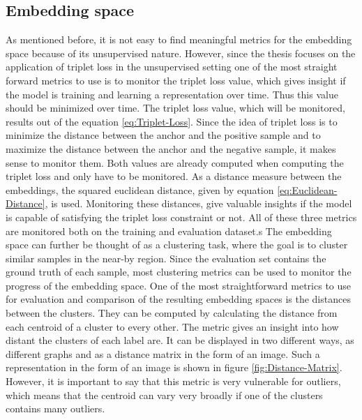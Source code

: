 \subsection{Embedding space}
\label{sub:Metrics-Embedding-Space}
As mentioned before, it is not easy to find meaningful metrics for the embedding space because of its unsupervised nature. However, since the thesis focuses on the application of triplet loss in the unsupervised setting one of the most straight forward metrics to use is to monitor the triplet loss value, which gives insight if the model is training and learning a representation over time. Thus this value should be minimized over time. The triplet loss value, which will be monitored, results out of the equation \ref{eq:Triplet-Loss}. Since the idea of triplet loss is to minimize the distance between the anchor and the positive sample and to maximize the distance between the anchor and the negative sample, it makes sense to monitor them. Both values are already computed when computing the triplet loss and only have to be monitored. As a distance measure between the embeddings, the squared euclidean distance, given by equation \ref{eq:Euclidean-Distance}, is used. Monitoring these distances, give valuable insights if the model is capable of satisfying the triplet loss constraint or not. All of these three metrics are monitored both on the training and evaluation dataset.s
\newline
\newline
The embedding space can further be thought of as a clustering task, where the goal is to cluster similar samples in the near-by region. Since the evaluation set contains the ground truth of each sample, most clustering metrics can be used to monitor the progress of the embedding space. 
\newline
\newline
One of the most straightforward metrics to use for evaluation and comparison of the resulting embedding spaces is the distances between the clusters. They can be computed by calculating the distance from each centroid of a cluster to every other. The metric gives an insight into how distant the clusters of each label are. It can be displayed in two different ways, as different graphs and as a distance matrix in the form of an image. Such a representation in the form of an image is shown in figure \ref{fig:Distance-Matrix}. However, it is important to say that this metric is very vulnerable for outliers, which means that the centroid can vary very broadly if one of the clusters contains many outliers.
